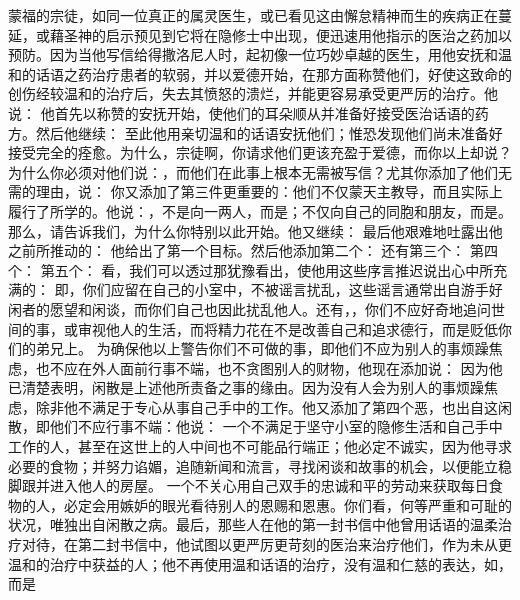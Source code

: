 蒙福的宗徒，如同一位真正的属灵医生，或已看见这由懈怠精神而生的疾病正在蔓延，或藉圣神的启示预见到它将在隐修士中出现，便迅速用他指示的医治之药加以预防。因为当他写信给得撒洛尼人时，起初像一位巧妙卓越的医生，用他安抚和温和的话语之药治疗患者的软弱，并以爱德开始，在那方面称赞他们，好使这致命的创伤经较温和的治疗后，失去其愤怒的溃烂，并能更容易承受更严厉的治疗。他说： 他首先以称赞的安抚开始，使他们的耳朵顺从并准备好接受医治话语的药方。然后他继续： 至此他用亲切温和的话语安抚他们；惟恐发现他们尚未准备好接受完全的痊愈。为什么，宗徒啊，你请求他们更该充盈于爱德，而你以上却说？为什么你必须对他们说：，而他们在此事上根本无需被写信？尤其你添加了他们无需的理由，说： 你又添加了第三件更重要的：他们不仅蒙天主教导，而且实际上履行了所学的。他说：，不是向一两人，而是；不仅向自己的同胞和朋友，而是。那么，请告诉我们，为什么你特别以此开始。他又继续： 最后他艰难地吐露出他之前所推动的： 他给出了第一个目标。然后他添加第二个： 还有第三个： 第四个： 第五个： 看，我们可以透过那犹豫看出，使他用这些序言推迟说出心中所充满的： 即，你们应留在自己的小室中，不被谣言扰乱，这些谣言通常出自游手好闲者的愿望和闲谈，而你们自己也因此扰乱他人。还有，，你们不应好奇地追问世间的事，或审视他人的生活，而将精力花在不是改善自己和追求德行，而是贬低你们的弟兄上。 为确保他以上警告你们不可做的事，即他们不应为别人的事烦躁焦虑，也不应在外人面前行事不端，也不贪图别人的财物，他现在添加说： 因为他已清楚表明，闲散是上述他所责备之事的缘由。因为没有人会为别人的事烦躁焦虑，除非他不满足于专心从事自己手中的工作。他又添加了第四个恶，也出自这闲散，即他们不应行事不端：他说： 一个不满足于坚守小室的隐修生活和自己手中工作的人，甚至在这世上的人中间也不可能品行端正；他必定不诚实，因为他寻求必要的食物；并努力谄媚，追随新闻和流言，寻找闲谈和故事的机会，以便能立稳脚跟并进入他人的房屋。 一个不关心用自己双手的忠诚和平的劳动来获取每日食物的人，必定会用嫉妒的眼光看待别人的恩赐和恩惠。你们看，何等严重和可耻的状况，唯独出自闲散之病。最后，那些人在他的第一封书信中他曾用话语的温柔治疗对待，在第二封书信中，他试图以更严厉更苛刻的医治来治疗他们，作为未从更温和的治疗中获益的人；他不再使用温和话语的治疗，没有温和仁慈的表达，如，而是 